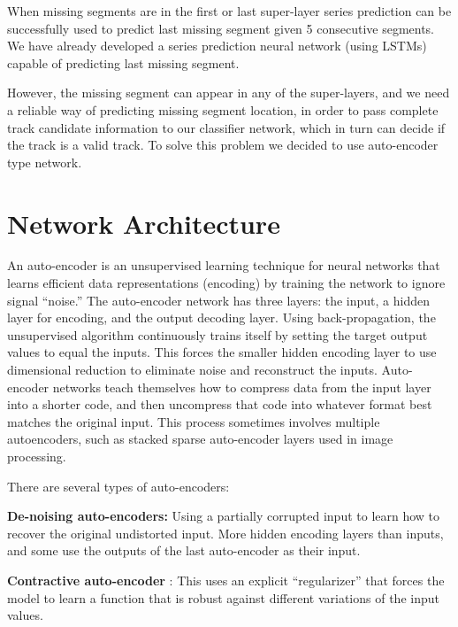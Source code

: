 \documentclass[12pt]{article}
\begin{document}
When missing segments are in the first or last super-layer series prediction can be successfully used to predict last missing segment given 5 consecutive segments. We have already developed a series prediction neural network (using LSTMs)~\cite{Angelopoulos20P} capable of predicting last missing segment. 

However, the missing segment can appear in any of the super-layers, and we need a reliable way of predicting missing segment location, in order to pass complete track candidate information to our classifier network, which in turn can decide if the track is a valid track. To solve this problem we decided to use auto-encoder type network.

\section{Network Architecture}

\indent

An auto-encoder is an unsupervised learning technique for neural networks that learns efficient data representations (encoding) by training the network to ignore signal “noise.” 
The auto-encoder network has three layers: the input, a hidden layer for encoding, and the output decoding layer. Using back-propagation, the unsupervised algorithm continuously trains itself by setting the target output values to equal the inputs. This forces the smaller hidden encoding layer to use dimensional reduction to eliminate noise and reconstruct the inputs.
Auto-encoder networks teach themselves how to compress data from the input layer into a shorter code, and then uncompress that code into whatever format best matches the original input. This process sometimes involves multiple autoencoders, such as stacked sparse auto-encoder layers used in image processing.

There are several types of auto-encoders:

{\bf De-noising auto-encoders:}  Using a partially corrupted input to learn how to recover the original undistorted input.
 More hidden encoding layers than inputs, and some use the outputs of the last auto-encoder as their input.

{\bf Contractive auto-encoder} : This uses an explicit “regularizer” that forces the model to learn a function that is robust against different variations of the input values.
\end{document}
